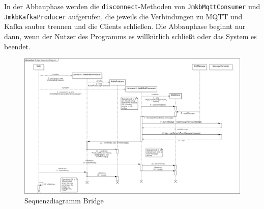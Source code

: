In der Abbauphase werden die \texttt{disconnect}-Methoden von \texttt{JmkbMqttConsumer} und \texttt{JmkbKafkaProducer} aufgerufen, die jeweils die Verbindungen zu MQTT und Kafka sauber trennen und die Clients schließen. Die Abbauphase beginnt nur dann, wenn der Nutzer des Programms es willkürlich schließt oder das System es beendet.
\begin{figure}[!hbp]
	\centering
	\includegraphics[width=\textheight,angle=90]{images/bridge/BridgeSequenceDiagram.png}
	\caption{Sequenzdiagramm Bridge}
\end{figure}
\newpage

